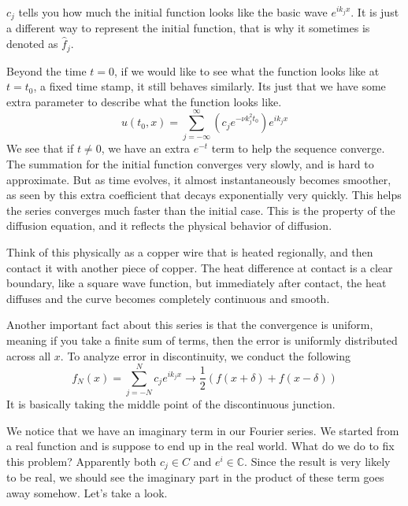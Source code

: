 \documentclass[12pt]{book}
\newcommand{\C}{\mathbb{C}}
\newcommand{\paren}[1]{\left( #1 \right)}
\begin{document}
$c_j$ tells you how much the initial function looks like the basic wave $e^{ik_j x}$. It is just a different  way to represent the initial function, that is why it sometimes is denoted as $\hat{f}_j$.

Beyond the time $t=0$, if we would like to see what the function looks like at $t=t_0$, a fixed time stamp, it still behaves similarly. Its just that we have some extra parameter to describe what the function looks like.
\[
u(t_0,x) =\sum_{j=-\infty}^{\infty}\paren{c_je^{-\nu k_j^2 t_0}}  e^{ik_j x}
\]
We see that if $t \neq 0$, we have an extra $e^{-t}$ term to help the sequence converge. The summation for the initial function converges very slowly, and is hard to approximate. But as time evolves, it almost instantaneously becomes smoother, as seen by this extra coefficient that decays exponentially very quickly. This helps the series converges much faster than the initial case. This is the property of the diffusion equation, and it reflects the physical behavior of diffusion. 

Think of this physically as a copper wire that is heated regionally, and then contact it with another piece of copper. The heat difference at contact is a clear boundary, like a square wave function, but immediately after contact, the heat diffuses and the curve becomes completely continuous and smooth.

Another important fact about this series is that the convergence is uniform, meaning if you take a finite sum of terms, then the error is uniformly distributed across all $x$. To analyze error in discontinuity, we conduct the following
\[
f_N(x) =  \sum_{j=-N}^{N} c_je^{i k_j x} \rightarrow \frac{1}{2}\paren{f(x+\delta)+f(x-\delta)}
\]
It is basically taking the middle point of the discontinuous junction. 

We notice that we have an imaginary term in our Fourier series. We started from a real function and is suppose to end up in the real world. What do we do to fix this problem? Apparently both $c_j\in C$ and $e^{i}\in\C$. Since the result is very likely to be real, we should see the imaginary part  in the product of these term goes away somehow. Let's take a look. 
\end{document}

